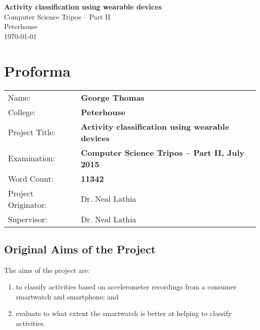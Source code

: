 \documentclass[12pt,a4paper,twoside,openright]{report}
\begin{document}


\pagestyle{empty}


\vspace*{60mm}
\begin{center}
\Huge
\textbf{Activity classification using wearable devices} \\[5mm]
Computer Science Tripos -- Part II \\[5mm]
Peterhouse \\[5mm]
\today  %
\end{center}


\pagestyle{plain}

\chapter*{Proforma}

{\large
\begin{tabular}{ll}
Name:               & \bf George Thomas                       \\
College:            & \bf Peterhouse                     \\
Project Title:      & \bf Activity classification using wearable devices \\
Examination:        & \bf Computer Science Tripos -- Part II, July 2015  \\
Word Count:         & \bf 11342 \\
Project Originator: & Dr. Neal Lathia                    \\
Supervisor:         & Dr. Neal Lathia                    \\
\end{tabular}
}


\section*{Original Aims of the Project}

  The aims of the project are:
  \begin{enumerate}
    \item to classify activities based on accelerometer recordings from a consumer smartwatch and smartphone; and
    \item evaluate to what extent the smartwatch is better at helping to classify activities.
  \end{enumerate}
\end{document}
